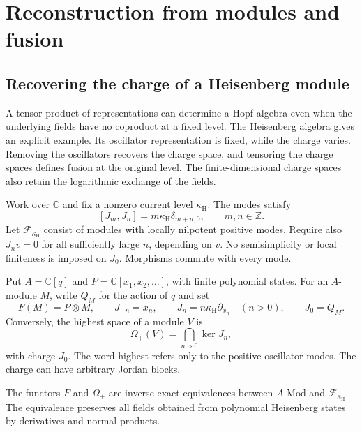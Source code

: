\chapter{Reconstruction from modules and fusion}
\label{cyrec:chapter}

\section{Recovering the charge of a Heisenberg module}

A tensor product of representations can determine a Hopf algebra
even when the underlying fields have no coproduct at a fixed level.
The Heisenberg algebra gives an explicit example. Its oscillator
representation is fixed, while the charge varies. Removing the
oscillators recovers the charge space, and tensoring the charge spaces
defines fusion at the original level. The finite-dimensional charge
spaces also retain the logarithmic exchange of the fields.

Work over $\mathbb C$ and fix a nonzero current level
$\kappa_{\mathrm H}$. The modes satisfy
\begin{equation}\label{cyrec:eq:heisenberg}
 [J_m,J_n]=m\kappa_{\mathrm H}\delta_{m+n,0},
 \qquad m,n\in\mathbb Z.
\end{equation}
Let $\mathscr F_{\kappa_{\mathrm H}}$ consist of modules with
locally nilpotent positive modes. Require also $J_nv=0$ for
all sufficiently large $n$, depending on $v$.
No semisimplicity or local finiteness is imposed on $J_0$.
Morphisms commute with every mode.

Put $A=\mathbb C[q]$ and
$P=\mathbb C[x_1,x_2,\ldots]$, with finite polynomial states.
For an $A$-module $M$, write $Q_M$ for the action of $q$ and set
\begin{equation}\label{cyrec:eq:fock}
 F(M)=P\otimes M,
 \qquad J_{-n}=x_n,
 \qquad J_n=n\kappa_{\mathrm H}\partial_{x_n}\quad(n>0),
 \qquad J_0=Q_M.
\end{equation}
Conversely, the highest space of a module $V$ is
\[
 \Omega_+(V)=\bigcap_{n>0}\ker J_n,
\]
with charge $J_0$. The word highest refers only to the positive
oscillator modes. The charge can have arbitrary Jordan blocks.

\begin{theorem}\label{cyrec:thm:oscillators}
The functors $F$ and $\Omega_+$ are inverse exact equivalences
between $A\text{-}\mathrm{Mod}$ and
$\mathscr F_{\kappa_{\mathrm H}}$. The equivalence preserves all
fields obtained from polynomial Heisenberg states by derivatives and
normal products.
\end{theorem}

